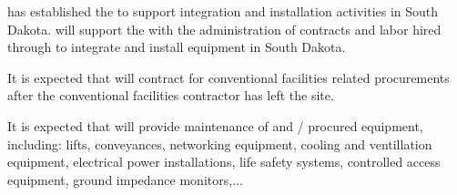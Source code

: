 \fnal has established the  to support integration and
installation activities in South Dakota.  will support the
 with the administration of contracts and labor hired
through \fnal to integrate and install equipment in South Dakota.

It is expected that  will contract for conventional
facilities related procurements after the  conventional facilities
contractor has left the site.

It is expected that  will provide maintenance of
 and / procured equipment, including:
lifts, conveyances, networking equipment, cooling and ventillation
equipment, electrical power installations, life safety systems,
controlled access equipment, ground impedance monitors,...

